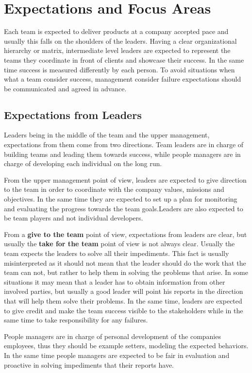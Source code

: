 \chapter{Expectations and Focus Areas}
\label{chapter:responsibilities}
Each team is expected to deliver products at a company accepted pace and usually this falls on the shoulders of the leaders. Having a clear organizational hierarchy or matrix, intermediate level leaders are expected to represent the teams they coordinate in front of clients and showcase their success. In the same time success is measured differently by each person.  To avoid situations when what a team consider success, management consider failure expectations should be communicated and agreed in advance.

\section{Expectations from Leaders}
\label{sec:fromleads}
Leaders being in the middle of the team and the upper management, expectations from them come from two directions. 
Team leaders are in charge of building teams and leading them towards success, while people managers are in charge of developing each individual on the long run. 

From the upper management point of view, leaders are expected to give direction to the team in order to coordinate with the company values, missions and objectives. In the same time they are expected to set up a plan for monitoring and evaluating the progress towards the team goals.Leaders are also expected to be team players and not individual developers.

From a \textbf{give to the team} point of view, expectations from leaders are clear, but usually the \textbf{take for the team} point of view is not always clear.  Usually the team expects the leaders to solve all their impediments. This fact is usually misinterpreted as it should not mean that the leader should do the work that the team can not, but rather to help them in solving the problems that arise. In some situations it may mean that a leader has to obtain information from other involved parties, but usually a good leader will point his reports in the direction that will help them solve their problems. In the same time, leaders are expected to give credit and make the team success visible to the stakeholders while in the same time to take responsibility for any failures.

People managers are in charge of personal development of the companies employees, thus they should be example setters, modeling the expected behaviors. In the same time people managers are expected to be fair in evaluation and proactive in solving impediments that their reports have.

